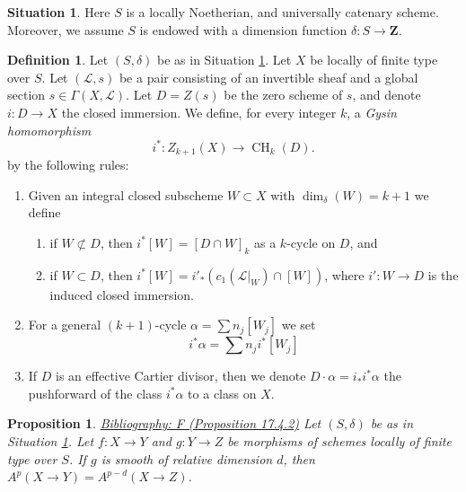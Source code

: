 \documentclass{amsart}
\newenvironment{reference}{\comment}{\endcomment}
\theoremstyle{plain}
\newtheorem{proposition}[subsection]{Proposition}
\theoremstyle{definition}
\newtheorem{definition}[subsection]{Definition}
\newtheorem{situation}[subsection]{Situation}
\theoremstyle{remark}
\numberwithin{equation}{subsection}
\def\CH{\mathop{\mathrm{CH}}\nolimits}
\begin{document}
\begin{situation}
\label{situation-setup}
Here $S$ is a locally Noetherian, and universally catenary scheme.
Moreover, we assume $S$ is endowed with a dimension function
$\delta : S \longrightarrow \mathbf{Z}$.
\end{situation}

\begin{definition}
\label{definition-gysin-homomorphism}
Let $(S, \delta)$ be as in Situation \ref{situation-setup}.
Let $X$ be locally of finite type over $S$.
Let $(\mathcal{L}, s)$ be a pair consisting of an invertible
sheaf and a global section $s \in \Gamma(X, \mathcal{L})$.
Let $D = Z(s)$ be the zero scheme of $s$, and
denote $i : D \to X$ the closed immersion.
We define, for every integer $k$, a {\it Gysin homomorphism}
$$
i^* : Z_{k + 1}(X) \to \CH_k(D).
$$
by the following rules:
\begin{enumerate}
\item Given an integral closed subscheme $W \subset X$ with
$\dim_\delta(W) = k + 1$ we define
\begin{enumerate}
\item if $W \not \subset D$, then $i^*[W] = [D \cap W]_k$ as a
$k$-cycle on $D$, and
\item if $W \subset D$, then
$i^*[W] = i'_*(c_1(\mathcal{L}|_W) \cap [W])$,
where $i' : W \to D$ is the induced closed immersion.
\end{enumerate}
\item For a general $(k + 1)$-cycle $\alpha = \sum n_j[W_j]$
we set
$$
i^*\alpha = \sum n_j i^*[W_j]
$$
\item If $D$ is an effective Cartier divisor, then we denote
$D \cdot \alpha = i_*i^*\alpha$ the pushforward of the class $i^*\alpha$
to a class on $X$.
\end{enumerate}
\end{definition}

\begin{proposition}
\label{proposition-compute-bivariant}
\begin{reference}
\href{https://stacks.math.columbia.edu/bibliography}{Bibliography: F (Proposition 17.4.2)}
\end{reference}
Let $(S, \delta)$ be as in Situation \ref{situation-setup}.
Let $f : X \to Y$ and $g : Y \to Z$ be morphisms of schemes locally
of finite type over $S$. If $g$ is smooth of relative dimension $d$, then
$A^p(X \to Y) = A^{p - d}(X \to Z)$.
\end{proposition}
\end{document}
